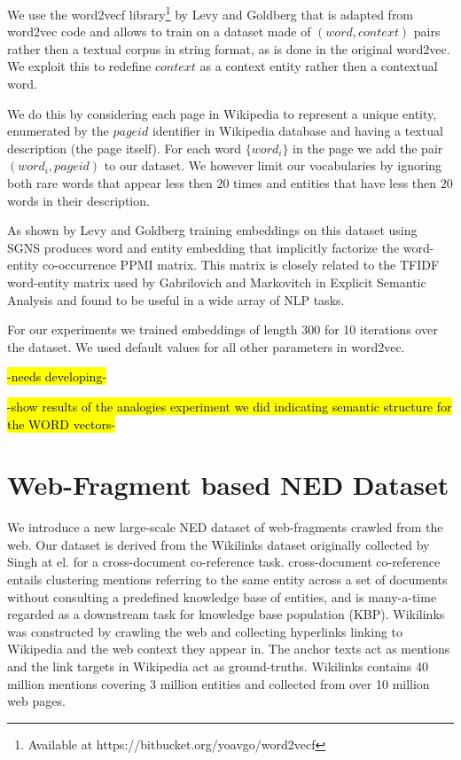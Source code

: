 \documentclass[11pt]{article}
\begin{document}
	We use the word2vecf library\footnote{Available at https://bitbucket.org/yoavgo/word2vecf} by Levy and Goldberg \cite{levy2014dependency} that is adapted from word2vec code and allows to train on a dataset made of $(word,context)$ pairs rather then a textual corpus in string format, as is done in the original word2vec. We exploit this to redefine $context$ as a context entity rather then a contextual word. 
	
	We do this by considering each page in Wikipedia to represent a unique entity, enumerated by the $pageid$ identifier in Wikipedia database and having a textual description (the page itself). For each word $\{word_i\}$ in the page we add the pair $(word_i,pageid)$ to our dataset. We however limit our vocabularies by ignoring both rare words that appear less then $20$ times and entities that have less then $20$ words in their description.
		
	As shown by Levy and Goldberg \cite{levy2014neural} training embeddings on this dataset using SGNS produces word and entity embedding that implicitly factorize the word-entity co-occurrence PPMI matrix. This matrix is closely related to the TFIDF word-entity matrix used by Gabrilovich and Markovitch \cite{gabrilovich2007computing} in Explicit Semantic Analysis and found to be useful in a wide array of NLP tasks. 
	
	For our experiments we trained embeddings of length 300 for 10 iterations over the dataset. We used default values for all other parameters in word2vec.
	
	\hl{-needs developing-}
	
	\hl{-show results of the analogies experiment we did indicating semantic structure for the WORD vectors-}
	
	\section{\label{sec:w}Web-Fragment based NED Dataset}
	We introduce a new large-scale NED dataset of web-fragments crawled from the web. Our dataset is derived from the Wikilinks dataset originally collected by Singh at el. \cite{singh12:wiki-links} for a cross-document co-reference task. cross-document co-reference entails clustering mentions referring to the same entity across a set of documents without consulting a predefined knowledge base of entities, and is many-a-time regarded as a downstream task for knowledge base population (KBP). Wikilinks was constructed by crawling the web and collecting hyperlinks linking to Wikipedia and the web context they appear in. The anchor texts act as mentions and the link targets in Wikipedia act as ground-truths. Wikilinks contains 40 million mentions covering 3 million entities and collected from over 10 million web pages.
	
\end{document}
